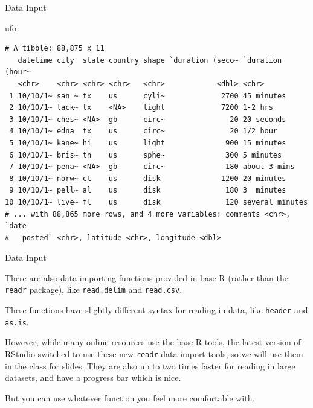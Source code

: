 \documentclass[
  ignorenonframetext,
]{beamer}
\newenvironment{Shaded}{\begin{snugshade}}{\end{snugshade}}
\newcommand{\NormalTok}[1]{#1}
\begin{document}
\begin{frame}[fragile]{Data Input}
\protect\hypertarget{data-input-10}{}

\begin{Shaded}
\begin{Highlighting}[]
\NormalTok{ufo}
\end{Highlighting}
\end{Shaded}

\begin{verbatim}
# A tibble: 88,875 x 11
   datetime city  state country shape `duration (seco~ `duration (hour~
   <chr>    <chr> <chr> <chr>   <chr>            <dbl> <chr>           
 1 10/10/1~ san ~ tx    us      cyli~             2700 45 minutes      
 2 10/10/1~ lack~ tx    <NA>    light             7200 1-2 hrs         
 3 10/10/1~ ches~ <NA>  gb      circ~               20 20 seconds      
 4 10/10/1~ edna  tx    us      circ~               20 1/2 hour        
 5 10/10/1~ kane~ hi    us      light              900 15 minutes      
 6 10/10/1~ bris~ tn    us      sphe~              300 5 minutes       
 7 10/10/1~ pena~ <NA>  gb      circ~              180 about 3 mins    
 8 10/10/1~ norw~ ct    us      disk              1200 20 minutes      
 9 10/10/1~ pell~ al    us      disk               180 3  minutes      
10 10/10/1~ live~ fl    us      disk               120 several minutes 
# ... with 88,865 more rows, and 4 more variables: comments <chr>, `date
#   posted` <chr>, latitude <chr>, longitude <dbl>
\end{verbatim}

\end{frame}

\begin{frame}[fragile]{Data Input}
\protect\hypertarget{data-input-11}{}

There are also data importing functions provided in base R (rather than
the \texttt{readr} package), like \texttt{read.delim} and
\texttt{read.csv}.

These functions have slightly different syntax for reading in data, like
\texttt{header} and \texttt{as.is}.

However, while many online resources use the base R tools, the latest
version of RStudio switched to use these new \texttt{readr} data import
tools, so we will use them in the class for slides. They are also up to
two times faster for reading in large datasets, and have a progress bar
which is nice.

But you can use whatever function you feel more comfortable with.

\end{frame}
\end{document}
